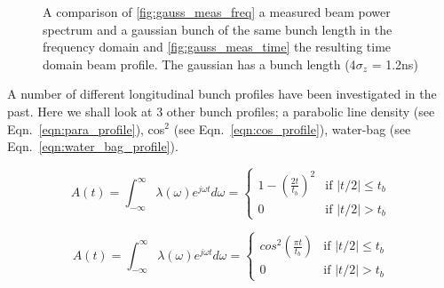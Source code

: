 \begin{figure}
\caption{A comparison of \ref{fig:gauss_meas_freq} a measured beam power spectrum and a gaussian bunch of the same bunch length in the frequency domain and \ref{fig:gauss_meas_time} the resulting time domain beam profile. The gaussian has a bunch length (4$\sigma_{z}$ = 1.2ns) }
\label{fig:measured_gauss}
\end{figure}

A number of different longitudinal bunch profiles have been investigated in the past. Here we shall look at 3 other bunch profiles; a parabolic line density (see Eqn.~\ref{eqn:para_profile}), cos$^{2}$ (see Eqn.~\ref{eqn:cos_profile}), water-bag (see Eqn.~\ref{eqn:water_bag_profile}).

\begin{equation}
A\left( t \right) = \int^{\infty}_{-\infty} \lambda \left( \omega \right) e^{j\omega t} d\omega = 
\begin{cases}1-\left( \frac{2t} {t_{b}} \right)^{2} &\textrm{if $| t/2 | \leq t_{b}$}\\
0								&\textrm{if $| t/2 | > t_{b}$}
\end{cases}
\label{eqn:para_profile}
\end{equation}

\begin{equation}
A\left( t \right) = \int^{\infty}_{-\infty} \lambda \left( \omega \right) e^{j\omega t} d\omega = 
\begin{cases}
cos^{2}\left( \frac{\pi t} {t_{b}} \right) &\textrm{if $| t/2 | \leq t_{b}$}\\
0								&\textrm{if $| t/2 | > t_{b}$}
\end{cases}
\label{eqn:cos_profile}
\end{equation}

